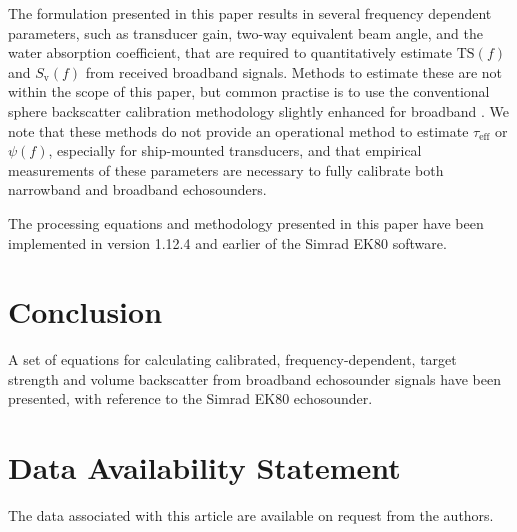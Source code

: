 \documentclass[preprint,12pt,TurnOnLineNumbers]{JASAnew}
\newcommand{\ek}{Simrad EK80}
\newcommand{\freqsym}{f}
\newcommand{\teff}{\tau_{\textrm{eff}}}
\newcommand{\ts}{\textrm{TS}}
\newcommand{\sv}{S_{\textrm{v}}}
\newcommand{\eqang}{\psi}
\begin{document}
The formulation presented in this paper results in several frequency dependent parameters, such as transducer gain, two-way equivalent beam angle, and the water absorption coefficient, that are required to quantitatively estimate $\ts(\freqsym)$ and $\sv(\freqsym)$ from received broadband signals. Methods to estimate these are not within the scope of this paper, but common practise is to use the conventional sphere backscatter calibration methodology \citep{demerCalibrationAcousticInstruments2015} slightly enhanced for broadband \citep{hobaekCharacterizationTargetSpheres2013, lavery2017}. We note that these methods do not provide an operational method to estimate $\teff$ or $\eqang(\freqsym)$, especially for ship-mounted transducers, and that empirical measurements of these parameters are necessary to fully calibrate both narrowband and broadband echosounders.

The processing equations and methodology presented in this paper have been implemented in version 1.12.4 and earlier of the \ek{} software.

\section{Conclusion}

A set of equations for calculating calibrated, frequency-dependent, target strength and volume backscatter from broadband echosounder signals have been presented, with reference to the \ek{} echosounder.

\section{Data Availability Statement}

The data associated with this article are available on request from the authors.

%
\end{document}
